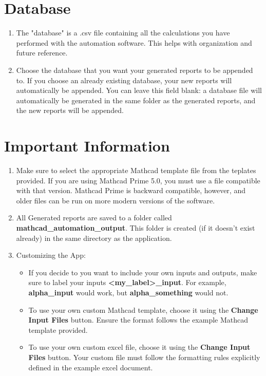 \documentclass[11pt]{article}
\begin{document}
\section{Database}
\label{sec:orgb42e5dc}
\begin{enumerate}
\item The "database" is a .csv file containing all the calculations you have performed with the automation software. This helps with organization and future reference.
\item Choose the database that you want your generated reports to be appended to. If you choose an already existing database, your new reports will automatically be appended. You can leave this field blank: a database file will automatically be generated in the same folder as the generated reports, and the new reports will be appended.
\end{enumerate}
\section{Important Information}
\label{sec:org9280484}
\begin{enumerate}
\item Make sure to select the appropriate Mathcad template file from the teplates provided. If you are using Mathcad Prime 5.0, you must use a file compatible with that version. Mathcad Prime is backward compatible, however, and older files can be run on more modern versions of the software.
\item All Generated reports are saved to a folder called \textbf{mathcad\_automation\_output}. This folder is created (if it doesn't exist already) in the same directory as the application.
\item Customizing the App:
\begin{itemize}
\item If you decide to you want to include your own inputs and outputs, make sure to label your inputs \textbf{<my\_label>\_input}. For example, \textbf{alpha\_input} would work, but \textbf{alpha\_something} would not.
\item To use your own custom Mathcad template, choose it using the \textbf{Change Input Files} button. Ensure the format follows the example Mathcad template provided.
\item To use your own custom excel file, choose it using the \textbf{Change Input Files} button. Your custom file must follow the formatting rules explicitly defined in the example excel document.
\end{itemize}
\end{enumerate}
\end{document}

